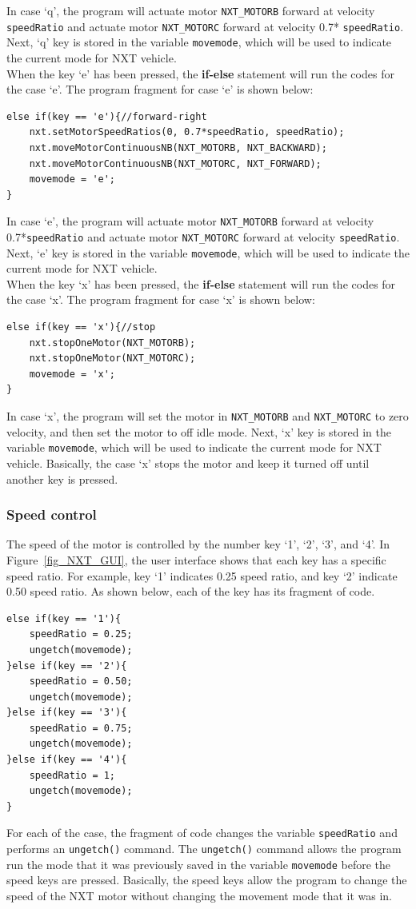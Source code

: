 \documentclass[11pt]{article}
\begin{document}
In case `q', the program will actuate motor {\tt NXT\_MOTORB} forward at velocity 
{\tt speedRatio} and actuate motor {\tt NXT\_MOTORC} forward at velocity 0.7*
{\tt speedRatio}. Next, `q' key is stored in the variable {\tt movemode}, which 
will be used to indicate the current mode for NXT vehicle.\\ 
When the key `e' has been pressed, the {\bf if-else} statement will run 
the codes for the case `e'. The program fragment for case `e' is shown below:
\begin{lstlisting}
else if(key == 'e'){//forward-right
    nxt.setMotorSpeedRatios(0, 0.7*speedRatio, speedRatio);
    nxt.moveMotorContinuousNB(NXT_MOTORB, NXT_BACKWARD);
    nxt.moveMotorContinuousNB(NXT_MOTORC, NXT_FORWARD);
    movemode = 'e';
}
\end{lstlisting}
In case `e', the program will actuate motor {\tt NXT\_MOTORB} forward at velocity 
0.7*{\tt speedRatio} and actuate motor {\tt NXT\_MOTORC} forward at velocity 
{\tt speedRatio}. Next, `e' key is stored in the variable {\tt movemode}, which 
will be used to indicate the current mode for NXT vehicle.\\ 
When the key `x' has been pressed, the {\bf if-else} statement will run 
the codes for the case `x'. The program fragment for case `x' is shown below:
\begin{lstlisting}
else if(key == 'x'){//stop
    nxt.stopOneMotor(NXT_MOTORB);
    nxt.stopOneMotor(NXT_MOTORC);
    movemode = 'x';
}
\end{lstlisting}
In case `x', the program will set the motor in {\tt NXT\_MOTORB} and 
{\tt NXT\_MOTORC} to zero velocity, and then set the motor to off idle mode. 
Next, `x' key is stored in the variable {\tt movemode}, which will be used to 
indicate the current mode for NXT vehicle. Basically, the case `x' stops the 
motor and keep it turned off until another key is pressed.

\subsubsection*{Speed control}
The speed of the motor is controlled by the number key `1', `2', `3', and `4'.
In Figure~\ref{fig_NXT_GUI}, the user interface shows that each key has a 
specific speed ratio. For example, key `1' indicates 0.25 speed ratio, and key 
`2' indicate 0.50 speed ratio. As shown below, each of the key has its fragment 
of code.
\begin{lstlisting}
else if(key == '1'){
    speedRatio = 0.25;
    ungetch(movemode);
}else if(key == '2'){
    speedRatio = 0.50;
    ungetch(movemode);
}else if(key == '3'){
    speedRatio = 0.75;
    ungetch(movemode);
}else if(key == '4'){
    speedRatio = 1;
    ungetch(movemode);
}
\end{lstlisting}
For each of the case, the fragment of code changes the variable {\tt speedRatio} 
and performs an {\tt ungetch()} command. The {\tt ungetch()} command allows the 
program run the mode that it was previously saved in the variable {\tt movemode}
before the speed keys are pressed. Basically, the speed keys allow the program 
to change the speed of the NXT motor without changing the movement mode that it 
was in.
\end{document}
